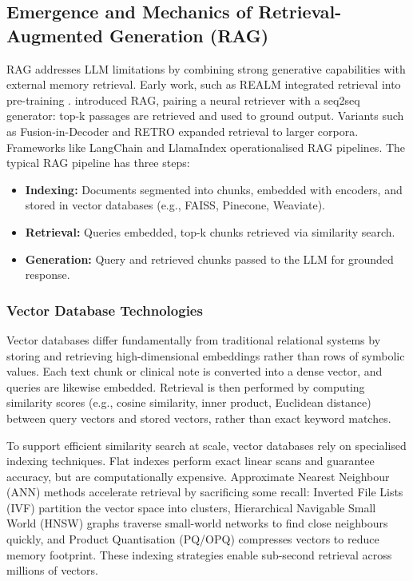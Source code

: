 \subsection{Emergence and Mechanics of Retrieval-Augmented Generation (RAG)}

RAG addresses LLM limitations by combining strong generative capabilities with external memory retrieval. Early work, such as REALM integrated retrieval into pre-training \citep{guu2020realm}. \citep{lewis2020rag} introduced RAG, pairing a neural retriever with a seq2seq generator: top-k passages are retrieved and used to ground output. Variants such as Fusion-in-Decoder \citep{izacard2021leveraging} and RETRO \citep{borgeaud2022retro} expanded retrieval to larger corpora. Frameworks like LangChain \citep{langchain2023} and LlamaIndex \citep{llamaindex2023} operationalised RAG pipelines.
\newline The typical RAG pipeline has three steps:
\begin{itemize}
  \item \textbf{Indexing:} Documents segmented into chunks, embedded with encoders, and stored in vector databases (e.g., FAISS, Pinecone, Weaviate).
  \item \textbf{Retrieval:} Queries embedded, top-k chunks retrieved via similarity search.
  \item \textbf{Generation:} Query and retrieved chunks passed to the LLM for grounded response.
\end{itemize}

\subsubsection{Vector Database Technologies}
Vector databases differ fundamentally from traditional relational systems by storing and retrieving high-dimensional embeddings rather than rows of symbolic values. Each text chunk or clinical note is converted into a dense vector, and queries are likewise embedded. Retrieval is then performed by computing similarity scores (e.g., cosine similarity, inner product, Euclidean distance) between query vectors and stored vectors, rather than exact keyword matches.

To support efficient similarity search at scale, vector databases rely on specialised indexing techniques. Flat indexes perform exact linear scans and guarantee accuracy, but are computationally expensive. Approximate Nearest Neighbour (ANN) methods accelerate retrieval by sacrificing some recall: Inverted File Lists (IVF) partition the vector space into clusters, Hierarchical Navigable Small World (HNSW) graphs traverse small-world networks to find close neighbours quickly, and Product Quantisation (PQ/OPQ) compresses vectors to reduce memory footprint. These indexing strategies enable sub-second retrieval across millions of vectors.

